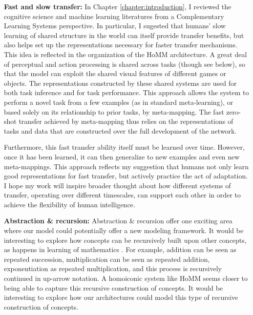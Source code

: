 \textbf{Fast and slow transfer:} In Chapter \ref{chapter:introduction}, I reviewed the cognitive science and machine learning literatures from a Complementary Learning Systems perspective. In particular, I sugested that humans' slow learning of shared structure in the world can itself provide transfer benefits, but also helps set up the representations necessary for faster transfer mechanisms. This idea is reflected in the organization of the HoMM architecture. A great deal of perceptual and action processing is shared across tasks (though see below), so that the model can exploit the shared visual features of different games or objects. The representations constructed by these shared systems are used for both task inference and for task performance. This approach allows the system to perform a novel task from a few examples (as in standard meta-learning), or based solely on its relationship to prior tasks, by meta-mapping. The fast zero-shot transfer achieved by meta-mapping thus relies on the representations of tasks and data that are constructed over the full development of the network. \par

Furthermore, this fast transfer ability itself must be learned over time. However, once it has been learned, it can then generalize to new examples and even new meta-mappings. This approach reflects my suggestion that humans not only learn good representations for fast transfer, but actively practice the act of adaptation. I hope my work will inspire broader thought about how different systems of transfer, operating over different timescales, can support each other in order to achieve the flexibility of human intelligence.\par

\textbf{Abstraction \& recursion:} Abstraction \& recursion offer one exciting area where our model could potentially offer a new modeling framework. It would be interesting to explore how concepts can be recursively built upon other concepts, as happens in learning of mathematics \citep{Wilensky1991, Hazzan1999, Lampinen2017b}. For example, addition can be seen as repeated succession, multiplication can be seen as repeated addition, exponentiation as repeated multiplication, and this process is recursively continued in up-arrow notation. A homoiconic system like HoMM seems closer to being able to capture this recursive construction of concepts. It would be interesting to explore how our architectures could model this type of recursive construction of concepts. \par 

